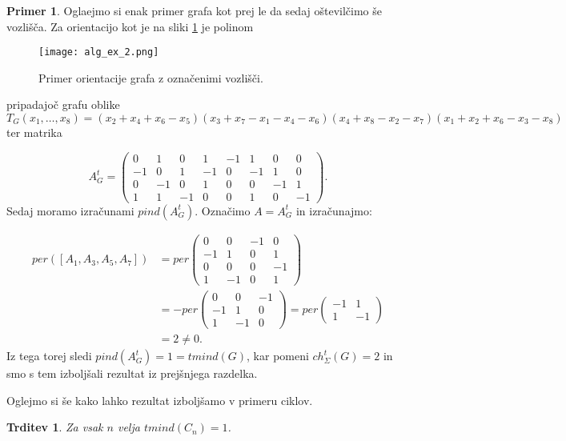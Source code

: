 \documentclass[12pt,a4paper,twoside]{article}
\theoremstyle{definition} %
\newtheorem{primer}[definicija]{Primer}
\theoremstyle{plain} %
\newtheorem{trditev}[definicija]{Trditev}
\newcommand{\eclt}{ch_{\Sigma}^t}
\numberwithin{equation}{section}  %
\begin{document}
\begin{primer}
Oglaejmo si enak primer grafa kot prej le da sedaj oštevilčimo še vozlišča. Za orientacijo kot je na sliki \ref{ex_2} je polinom
 \begin{figure}[h!]
\caption{Primer orientacije grafa z označenimi vozlišči.}
\label{ex_2}
\centering
    \texttt{[image: alg\_ex\_2.png]}
    \end{figure}
pripadajoč grafu oblike $T_G(x_1, \ldots, x_8) = (x_2 + x_4 + x_6 - x_5)(x_3 + x_7 - x_1 - x_4 - x_6)(x_4 + x_8 - x_2 - x_7)(x_1 + x_2 + x_6 - x_3 - x_8)$ ter matrika 

$$A_G^t = \left( \begin{matrix} 0 & 1 & 0 & 1 & -1 & 1 & 0 & 0 \\ -1 & 0 & 1 & -1 & 0 & -1 & 1 & 0 \\ 0 & -1 & 0 & 1 & 0 & 0 & -1 & 1 \\ 1 & 1 & -1 & 0 & 0 & 1 & 0 & -1 \end{matrix} \right).$$
Sedaj moramo izračunami $pind(A_G^t)$. Označimo $A =A_G^t$ in izračunajmo:

\begin{equation*}
\begin{split}
 per([A_1, A_3, A_5, A_7]) &= per\left( \begin{matrix} 0 & 0 & -1 & 0 \\ -1 & 1 & 0 & 1 \\ 0 & 0 & 0 & -1 \\ 1 & -1 & 0 & 1 \end{matrix} \right) \\
&= -per\left( \begin{matrix} 0 & 0 & -1 \\ -1 & 1 & 0 \\ 1 & -1 & 0 \end{matrix} \right) = per\left( \begin{matrix} -1 & 1 \\ 1 & -1 \end{matrix} \right) \\
&=2 \neq 0.
\end{split}
\end{equation*}
Iz tega torej sledi $pind(A_G^t) = 1 = tmind(G)$, kar pomeni $\eclt(G) = 2$ in smo s tem izboljšali rezultat iz prejšnjega razdelka.
\end{primer}

Oglejmo si še kako lahko rezultat izboljšamo v primeru ciklov.
\begin{trditev}
Za vsak $n$ velja $tmind(C_n) = 1$.
\end{trditev}
\end{document}
